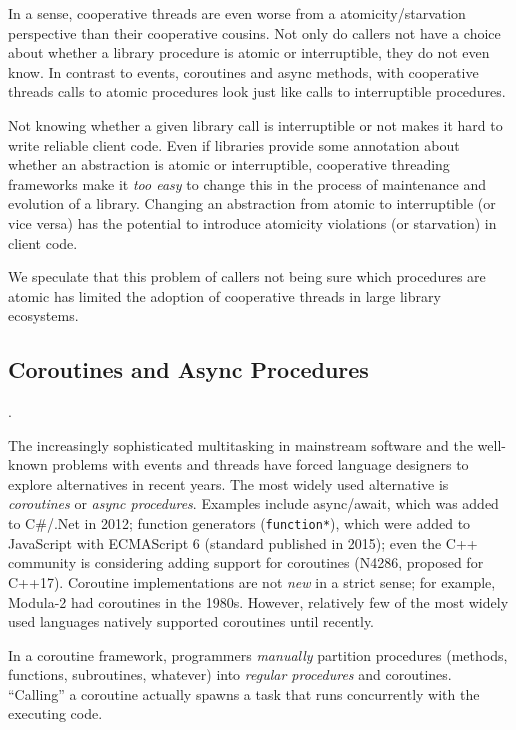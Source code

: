 \documentclass[preprint, 10pt, numbers]{sigplanconf}
\begin{document}
In a sense, cooperative threads are even worse from a atomicity/starvation perspective than their cooperative cousins.
Not only do callers not have a choice about whether a library procedure is atomic or interruptible, they do not even know.
In contrast to events, coroutines and async methods, with cooperative threads calls to atomic procedures look just like calls to interruptible procedures.

Not knowing whether a given library call is interruptible or not makes it hard to write reliable client code.
Even if libraries provide some annotation about whether an abstraction is atomic or interruptible, cooperative threading frameworks make it \emph{too easy} to change this in the process of maintenance and evolution of a library.
Changing an abstraction from atomic to interruptible (or vice versa) has the potential to introduce atomicity violations (or starvation) in client code.

We speculate that this problem of callers not being sure which procedures are atomic has limited the adoption of cooperative threads in large library ecosystems.

\subsection{Coroutines and Async Procedures}.

The increasingly sophisticated multitasking in mainstream software and the well-known problems with events and threads have forced language designers to explore alternatives in recent years.
The most widely used alternative is \emph{coroutines} or \emph{async procedures}\footnotemark{}.
Examples include async/await, which was added to C\#/.Net in 2012; function generators (\texttt{function*}), which were added to JavaScript with ECMAScript 6 (standard published in 2015); even the C++ community is considering adding support for coroutines (N4286, proposed for C++17).
Coroutine implementations are not \emph{new} in a strict sense; for example, Modula-2 had coroutines in the 1980s.
However, relatively few of the most widely used languages natively supported coroutines until recently.


In a coroutine framework, programmers \emph{manually} partition procedures (methods, functions, subroutines, whatever) into \emph{regular procedures} and coroutines.
``Calling'' a coroutine actually spawns a task that runs concurrently with the executing code.
\end{document}
